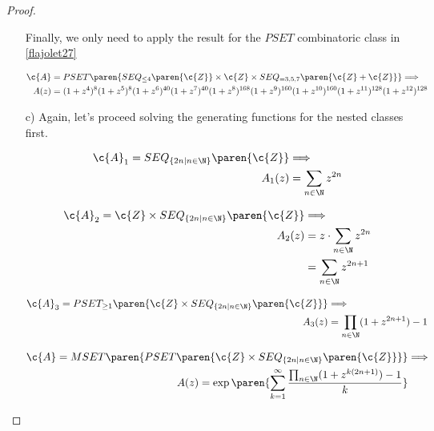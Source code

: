 \begin{proof}
\begin{itemize}
            Finally, we only need to apply the result for the $PSET$ combinatoric class in \eqref{flajolet27}
            
            \begin{align}
                    \c{A} &= 
                    PSET\paren{ SEQ_{\leq 4} \paren{\c{Z}} \times \c{Z} \times SEQ_{=3,5,7}\paren{ \c{Z} + \c{Z} } } \Longrightarrow \\
                    A(z) &= (1 + z^4)^{8}(1 + z^5)^{8}(1 + z^6)^{40}(1 + z^7)^{40}(1 + z^8)^{168}(1 + z^9)^{160}(1 + z^{10})^{160}(1 + z^{11})^{128}(1 + z^{12})^{128}                   
            \end{align}
            
        \item[c)]
            Again, let's proceed solving the generating functions for the nested classes first.
            
            \begin{align}
                    \c{A}_1 =   SEQ_{\{ 2n | n \in \N \}}\paren{\c{Z}}  &   \Longrightarrow \\
                    A_1(z)                                              &=  \sum_{n \in \N} z^{2n}
            \end{align}
        
            \begin{align}
                    \c{A}_2 = \c{Z} \times SEQ_{\{ 2n | n \in \N \}}\paren{\c{Z}}   &   \Longrightarrow                 \\
                    A_2(z)                                                          &= z \cdot \sum_{n \in \N} z^{2n}   \\
                                                                                    &= \sum_{n \in \N} z^{2n+1} 
            \end{align}
            
            \begin{align}
                    \c{A}_3 = PSET_{\geq 1}\paren{ \c{Z} \times SEQ_{\{ 2n | n \in \N \}}\paren{\c{Z}} } &\Longrightarrow        \\
                    A_3(z)                                                                      &= \prod_{n \in \N} (1 + z^{2n + 1}) - 1
            \end{align}
           
            \begin{align}
                    \c{A} = 
                    MSET\paren{ PSET\paren{ \c{Z} \times SEQ_{\{ 2n | n \in \N \}}\paren{\c{Z}} } } &\Longrightarrow    \\
                    A(z) = \exp\paren{ \sum_{k=1}^\infty \frac{\prod_{n \in \N} (1 + z^{k(2n + 1)}) - 1}{k}}
            \end{align}
    \end{itemize}
\end{proof}